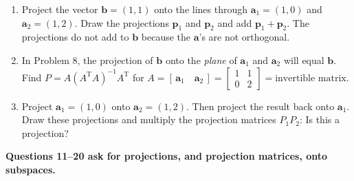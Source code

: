 \documentclass[14pt, a4paper]{article}
\begin{document}
\begin{enumerate}
    \item Project the vector $\boldsymbol{b} = (1, 1)$ onto the lines through $\boldsymbol{a}_1 = (1, 0)$ and $\boldsymbol{a}_2 = (1, 2)$. Draw the projections $\boldsymbol{p}_1$ and $\boldsymbol{p}_2$ and add $\boldsymbol{p}_1 + \boldsymbol{p}_2$. The projections do not add to $\boldsymbol{b}$ because the $\boldsymbol{a}$'s are not orthogonal.

    \item In Problem 8, the projection of $\boldsymbol{b}$ onto the \emph{plane} of $\boldsymbol{a}_1$ and $\boldsymbol{a}_2$ will equal $\boldsymbol{b}$. Find $P = A(A^{\mathrm{T}}A)^{-1}A^{\mathrm{T}}$ for $A = [\, \boldsymbol{a}_1 \quad \boldsymbol{a}_2 \,] = \begin{bmatrix} 1 & 1 \\ 0 & 2 \end{bmatrix} = \text{invertible matrix}$.

    \item Project $\boldsymbol{a}_1 = (1, 0)$ onto $\boldsymbol{a}_2 = (1, 2)$. Then project the result back onto $\boldsymbol{a}_1$. Draw these projections and multiply the projection matrices $P_1 P_2$: Is this a projection?
\end{enumerate}
\noindent \textbf{Questions 11--20 ask for projections, and projection matrices, onto subspaces.}
\end{document}
